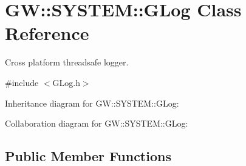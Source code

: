 \hypertarget{classGW_1_1SYSTEM_1_1GLog}{}\section{GW\+:\+:S\+Y\+S\+T\+EM\+:\+:G\+Log Class Reference}
\label{classGW_1_1SYSTEM_1_1GLog}


Cross platform threadsafe logger.  




{\ttfamily \#include $<$G\+Log.\+h$>$}



Inheritance diagram for GW\+:\+:S\+Y\+S\+T\+EM\+:\+:G\+Log\+:


Collaboration diagram for GW\+:\+:S\+Y\+S\+T\+EM\+:\+:G\+Log\+:
\subsection*{Public Member Functions}
